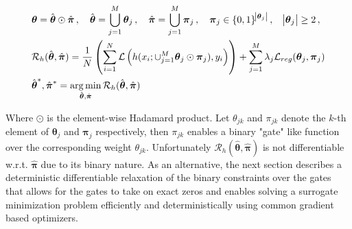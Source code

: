 \documentclass[final,1p,times]{elsarticle}
\DeclareMathOperator*{\argmin}{arg\,min}
\begin{document}
\begin{align}
& \boldsymbol{\theta} = \hat{\boldsymbol{\theta}} \odot \hat{\boldsymbol{\pi}} \, , \quad \hat{\boldsymbol{\theta}} = \bigcup\limits_{j=1}^{M} \boldsymbol{\theta}_j \, , \quad \hat{\boldsymbol{\pi}} = \bigcup\limits_{j=1}^{M} \boldsymbol{\pi}_j \, , \quad  \boldsymbol{\pi}_j \in \{0,1\}^{\abs{\boldsymbol{\theta}_j}} \, , \quad \abs{\boldsymbol{\theta}_j} \geq 2 \, , \label{eq:risk_pi_a} \\
& \mathcal{R}_{h}(\hat{\boldsymbol{\theta}}, \hat{\boldsymbol{\pi}}) = \frac{1}{N} \left(\sum_{i=1}^{N}\mathcal{L} \left( h(x_i;\cup_{j=1}^{M}\boldsymbol{\theta}_j \odot \boldsymbol{\pi}_j),y_i \right) \right) + \sum\limits_{j=1}^M \lambda_j \mathcal{L}_{reg}(\boldsymbol{\theta}_j, \boldsymbol{\pi}_j)\label{eq:risk_pi_b} \\
& \hat{\boldsymbol{\theta}}^{*} , \hat{\boldsymbol{\pi}}^{*} = \argmin_{\hat{\boldsymbol{\theta}}, \hat{\boldsymbol{\pi}}} \mathcal{R}_{h} (\hat{\boldsymbol{\theta}},\hat{\boldsymbol{\pi}}) \label{eq:risk_pi_c}
\end{align}

Where $\odot$ is the element-wise Hadamard product. Let $\theta_{jk}$ and $\pi_{jk}$ denote the $k$-th element of $\boldsymbol{\theta}_j$ and $\boldsymbol{\pi}_j$ respectively, then $\pi_{jk}$ enables a binary "gate" like function over the corresponding weight $\theta_{jk}$. Unfortunately $\mathcal{R}_{h}(\hat{\boldsymbol{\theta}}, \hat{\boldsymbol{\pi}})$ is not differentiable w.r.t. $\hat{\boldsymbol{\pi}}$ due to its binary nature. As an alternative, the next section describes a deterministic differentiable relaxation of the binary constraints over the gates that allows for the gates to take on exact zeros and enables solving a surrogate minimization problem efficiently and deterministically using common gradient based optimizers.
\end{document}
